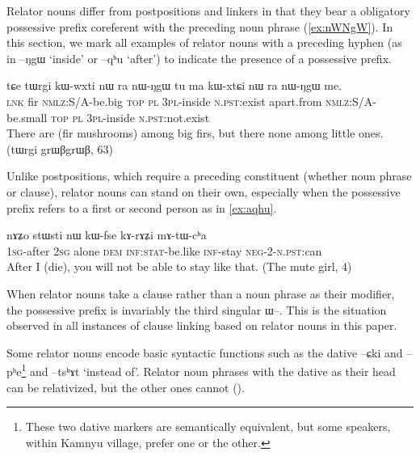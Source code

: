 \documentclass[oldfontcommands,oneside,a4paper,11pt]{article}
\newcommand{\ipa}[1]{{\phon \mbox{#1}}} %
\begin{document}
Relator nouns differ from postpositions and linkers in that they bear a obligatory possessive prefix coreferent with the preceding    noun phrase (\ref{ex:nWNgW}). In this section, we mark all examples of relator nouns with a preceding hyphen (as in \ipa{--ŋgɯ} `inside' or \ipa{--qʰu} `after') to indicate the  presence of a possessive prefix.

 \begin{exe}
\ex \label{ex:nWNgW} 
\gll  
\ipa{tɕe}  	\ipa{tɯrgi}  	\ipa{kɯ-wxti}  	\ipa{nɯ} \ipa{ra}  	\ipa{nɯ-ŋgɯ}  	\ipa{tu}  	\ipa{ma}  	\ipa{kɯ-xtɕi}  	\ipa{nɯ} \ipa{ra}  	\ipa{nɯ-ŋgɯ}  	\ipa{me.}  \\
\textsc{lnk} fir \textsc{nmlz}:S/A-be.big \textsc{top} \textsc{pl} \textsc{3pl}-inside \textsc{n.pst}:exist apart.from \textsc{nmlz:S/A}-be.small  \textsc{top} \textsc{pl} \textsc{3pl}-inside  \textsc{n.pst}:not.exist \\
\glt There are (fir mushrooms) among big firs, but there none among little ones. (tɯrgi grɯβgrɯβ, 63)
\end{exe}


Unlike postpositions, which require a preceding constituent (whether noun phrase or clause), relator nouns can stand on their own, especially when the possessive prefix refers to a first or second person as in \ref{ex:aqhu}.

 \begin{exe}
\ex \label{ex:aqhu} 
\gll  \ipa{a-qʰu}  	\ipa{nɤʑo}  	\ipa{stɯsti}  	\ipa{nɯ}  	\ipa{kɯ-fse}  	\ipa{kɤ-rɤʑi}  	\ipa{mɤ-tɯ-cʰa}  \\
\textsc{1sg}-after \textsc{2sg} alone \textsc{dem} \textsc{inf:stat}-be.like \textsc{inf}-stay \textsc{neg-2-n.pst}:can \\
\glt After I (die), you will not be able to stay like that. (The mute girl, 4)
\end{exe}

When relator nouns take a clause  rather than a noun phrase as their modifier, the possessive prefix is invariably the third singular \ipa{ɯ--}. This is the situation observed in all instances of clause linking based on relator nouns in this paper.



Some relator nouns encode basic syntactic functions such as the dative \ipa{--ɕki} and \ipa{--pʰe}\footnote{These two dative markers are semantically equivalent, but some speakers, within Kamnyu village, prefer one or the other.} and \ipa{--tsʰɤt} `instead of'.   Relator noun phrases with the dative as their head can be relativized, but the other ones cannot (\citealt{jacques14relatives}).
\end{document}
